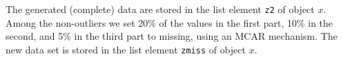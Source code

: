 \documentclass{scrartcl}
\begin{document}
The generated (complete) data are stored in the list element \texttt{z2}
of object $x$. Among the non-outliers we set 20\% of the values in the first
part, 10\% in the second, and 5\% in the third part to missing, using an
MCAR mechanism. The new data set is stored in the list element \texttt{zmiss} of object $x$.




 



\begin{knitrout}
\color{fgcolor}\begin{kframe}


{\ttfamily\noindent{}}\end{kframe}
\end{knitrout}
\end{document}
